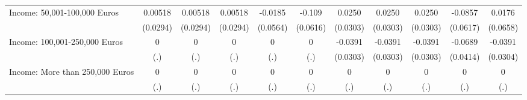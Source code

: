 {\begin{tabular}{l*{10}{c}}
Income: 50,001-100,000 Euros&     0.00518         &     0.00518         &     0.00518         &     -0.0185         &      -0.109         &      0.0250         &      0.0250         &      0.0250         &     -0.0857         &      0.0176         \\
            &    (0.0294)         &    (0.0294)         &    (0.0294)         &    (0.0564)         &    (0.0616)         &    (0.0303)         &    (0.0303)         &    (0.0303)         &    (0.0617)         &    (0.0658)         \\
\addlinespace
Income: 100,001-250,000 Euros&           0         &           0         &           0         &           0         &           0         &     -0.0391         &     -0.0391         &     -0.0391         &     -0.0689         &     -0.0391         \\
            &         (.)         &         (.)         &         (.)         &         (.)         &         (.)         &    (0.0303)         &    (0.0303)         &    (0.0303)         &    (0.0414)         &    (0.0304)         \\
\addlinespace
Income: More than 250,000 Euros&           0         &           0         &           0         &           0         &           0         &           0         &           0         &           0         &           0         &           0         \\
            &         (.)         &         (.)         &         (.)         &         (.)         &         (.)         &         (.)         &         (.)         &         (.)         &         (.)         &         (.)         \\
\bottomrule
\end{tabular}
}
